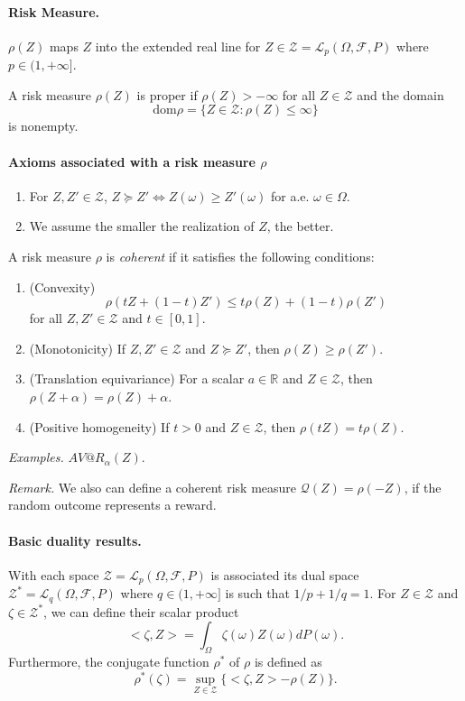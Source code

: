 \documentclass[a4pper,11pt]{article}
\newcommand{\br}{\mathbb R}
\begin{document}
\paragraph{Risk Measure.} $\rho(Z)$ maps $Z$ into the extended real line for $Z\in \mathcal Z=\mathcal L_p(\Omega,\mathcal F,P)$ where $p\in (1,+\infty]$.

A risk measure $\rho(Z)$ is proper if $\rho(Z)>-\infty$ for all $Z\in \mathcal Z$ and the domain 
$$\text{dom}\rho=\{Z\in \mathcal Z: \rho(Z)\leq \infty\}$$
is nonempty.
\paragraph{Axioms associated with a risk measure $\rho$}
\begin{enumerate}
	\item For $Z,Z'\in \mathcal Z$, $Z\succeq Z'\Leftrightarrow Z(\omega)\geq Z'(\omega)$ for a.e. $\omega \in \Omega$.
	\item We assume the smaller the realization of $Z$, the better.
\end{enumerate}

A risk measure $\rho$ is \textit{coherent} if it satisfies the following conditions:
\begin{enumerate}
	\item (Convexity)
	$$\rho(tZ+(1-t)Z')\leq t\rho(Z)+(1-t)\rho(Z')$$
	for all $Z,Z'\in \mathcal Z$ and $t\in[0,1]$.
	\item (Monotonicity) If $Z,Z'\in \mathcal Z$ and $Z\succeq Z'$, then $\rho(Z)\geq \rho(Z')$.
	\item (Translation equivariance) For a scalar $a\in \br$ and $Z\in \mathcal Z$, then $\rho (Z+\alpha)=\rho(Z)+\alpha$.
	\item (Positive homogeneity) If $t>0$ and $Z\in \mathcal Z$, then $\rho(tZ)=t\rho (Z)$.
\end{enumerate}
\textit{Examples.} $AV@R_\alpha(Z)$.

\textit{Remark.} We also can define a coherent risk measure $\mathcal Q(Z)=\rho(-Z)$, if the random outcome represents a reward.

\paragraph{Basic duality results.}
With each space $\mathcal Z= \mathcal L_p(\Omega,\mathcal F,P)$ is associated its dual space $\mathcal Z^*=\mathcal L_q(\Omega,\mathcal F,P)$ where $q\in (1,+\infty]$ is such that $1/p+1/q=1$. For $Z\in \mathcal Z$ and $\zeta\in \mathcal Z^*$, we can define their scalar product
$$<\zeta,Z>=\int_\Omega \zeta(\omega)Z(\omega) dP(\omega).$$
Furthermore, the conjugate function $\rho^*$ of $\rho$ is defined as
$$\rho^*(\zeta)=\sup_{Z\in \mathcal Z}\{<\zeta,Z>-\rho(Z)\}.$$
\end{document}
